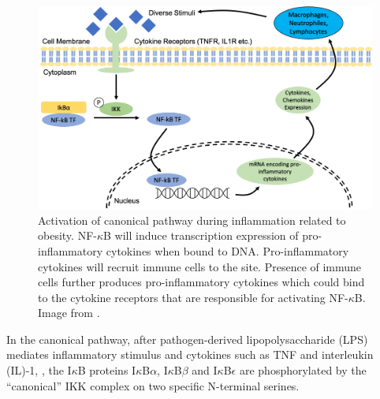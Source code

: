 \documentclass[12pt,a4paper]{report}
\begin{document}
  

\begin{figure}[!ht]
\includegraphics[scale=0.45]{NFkBmechanism.png}
\caption{Activation of canonical pathway during inflammation related to obesity. NF-$\kappa$B will induce transcription expression of pro-inflammatory cytokines when bound to DNA. Pro-inflammatory cytokines will recruit immune cells to the site. Presence of immune cells further produces pro-inflammatory cytokines which could bind to the cytokine receptors that are responsible for activating NF-$\kappa$B. Image from \cite{Project}.}
\label{NFkBmechanism}
\end{figure}
\newpage
In the canonical pathway, after pathogen-derived lipopolysaccharide (LPS) mediates inflammatory stimulus and cytokines such as TNF and interleukin (IL)-1, , the I$\kappa$B proteins I$\kappa$B$\alpha$, I$\kappa$B$\beta$ and I$\kappa$B$\epsilon$ are phosphorylated by the “canonical” IKK complex on two specific N-terminal serines.
\end{document}
